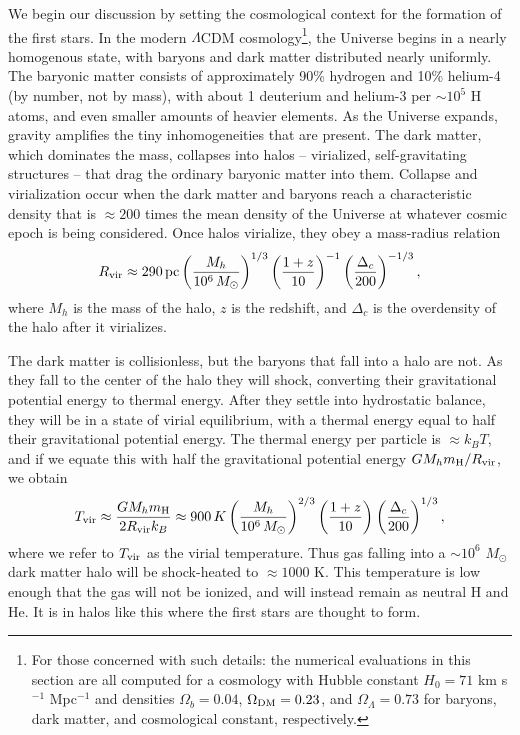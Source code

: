 We begin our discussion by setting the cosmological context for the formation of the first stars. In the modern $\Lambda$CDM cosmology\footnote{For those concerned with such details: the numerical evaluations in this section are all computed for a cosmology with Hubble constant $H_0=71$ km s$^{-1}$ Mpc$^{-1}$ and densities $\Omega_b = 0.04$, $\Omega_{\rm DM} = 0.23$, and $\Omega_\Lambda = 0.73$ for baryons, dark matter, and cosmological constant, respectively.}, the Universe begins in a nearly homogenous state, with baryons and dark matter distributed nearly uniformly. The baryonic matter consists of approximately 90\% hydrogen and 10\% helium-4 (by number, not by mass), with about 1 deuterium and helium-3 per $\sim 10^5$ H atoms, and even smaller amounts of heavier elements. As the Universe expands, gravity amplifies the tiny inhomogeneities that are present. The dark matter, which dominates the mass, collapses into halos -- virialized, self-gravitating structures -- that drag the ordinary baryonic matter into them. Collapse and virialization occur when the dark matter and baryons reach a characteristic density that is $\approx 200$ times the mean density of the Universe at whatever cosmic epoch is being considered. Once halos virialize, they obey a mass-radius relation \citep{barkana01a}
\begin{equation}
R_{\rm vir} \approx 290\,\mathrm{pc} \left(\frac{M_h}{10^6\,M_\odot}\right)^{1/3} \left(\frac{1+z}{10}\right)^{-1} \left(\frac{\Delta_c}{200}\right)^{-1/3},
\end{equation}
where $M_h$ is the mass of the halo, $z$ is the redshift, and $\Delta_c$ is the overdensity of the halo after it virializes.

The dark matter is collisionless, but the baryons that fall into a halo are not. As they fall to the center of the halo they will shock, converting their gravitational potential energy to thermal energy. After they settle into hydrostatic balance, they will be in a state of virial equilibrium, with a thermal energy equal to half their gravitational potential energy. The thermal energy per particle is $\approx k_B T$, and if we equate this with half the gravitational potential energy $G M_h m_{\rm H}/R_{\rm vir}$, we obtain
\begin{equation}
T_{\rm vir} \approx \frac{G M_h m_{\rm H}}{2R_{\rm vir} k_B} \approx 900\,K 
\left(\frac{M_h}{10^6\,M_\odot}\right)^{2/3} \left(\frac{1+z}{10}\right)^{} \left(\frac{\Delta_c}{200}\right)^{1/3},
\end{equation}
where we refer to $T_{\rm vir}$ as the virial temperature. Thus gas falling into a $\sim 10^6$ $M_\odot$ dark matter halo will be shock-heated to $\approx 1000$ K. This temperature is low enough that the gas will not be ionized, and will instead remain as neutral H and He. It is in halos like this where the first stars are thought to form.


